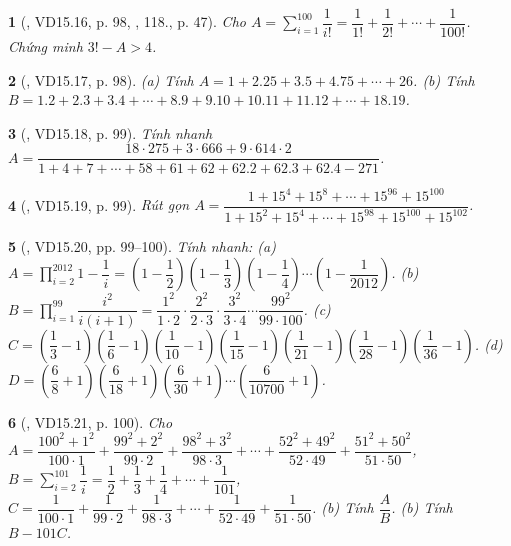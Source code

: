 \documentclass{article}
\newtheorem{baitoan}{}
\begin{document}
\begin{baitoan}[\cite{TLCT_THCS_Toan_6_so_hoc}, VD15.16, p. 98, \cite{Binh_Toan_6_tap_2}, 118., p. 47]
	Cho $A = \sum_{i=1}^{100} \dfrac{1}{i!} = \dfrac{1}{1!} + \dfrac{1}{2!} + \cdots + \dfrac{1}{100!}$. Chứng minh $3! - A > 4$.
\end{baitoan}

\begin{baitoan}[\cite{TLCT_THCS_Toan_6_so_hoc}, VD15.17, p. 98]
	(a) Tính $A = 1 + 2.25 + 3.5 + 4.75 + \cdots + 26$. (b) Tính $B = 1.2 + 2.3 + 3.4 + \cdots + 8.9 + 9.10 + 10.11 + 11.12 + \cdots + 18.19$.
\end{baitoan}

\begin{baitoan}[\cite{TLCT_THCS_Toan_6_so_hoc}, VD15.18, p. 99]
	Tính nhanh $A = \dfrac{18\cdot275 + 3\cdot666 + 9\cdot614\cdot2}{1 + 4 + 7 + \cdots + 58 + 61 + 62 + 62.2 + 62.3 + 62.4 - 271}$.
\end{baitoan}

\begin{baitoan}[\cite{TLCT_THCS_Toan_6_so_hoc}, VD15.19, p. 99]
	Rút gọn $A = \dfrac{1 + 15^4 + 15^8 + \cdots + 15^{96} + 15^{100}}{1 + 15^2 + 15^4 + \cdots + 15^{98} + 15^{100} + 15^{102}}$.
\end{baitoan}

\begin{baitoan}[\cite{TLCT_THCS_Toan_6_so_hoc}, VD15.20, pp. 99--100]
	Tính nhanh: (a) $A = \prod_{i=2}^{2012} 1  - \dfrac{1}{i} = \left(1 - \dfrac{1}{2}\right)\left(1 - \dfrac{1}{3}\right)\left(1 - \dfrac{1}{4}\right)\cdots\left(1 - \dfrac{1}{2012}\right)$. (b) $B = \prod_{i=1}^{99} \dfrac{i^2}{i(i + 1)} = \dfrac{1^2}{1\cdot2}\cdot\dfrac{2^2}{2\cdot3}\cdot\dfrac{3^2}{3\cdot4}\cdots\dfrac{99^2}{99\cdot100}$. (c) $C = \left(\dfrac{1}{3} - 1\right)\left(\dfrac{1}{6} - 1\right)\left(\dfrac{1}{10} - 1\right)\left(\dfrac{1}{15} - 1\right)\left(\dfrac{1}{21} - 1\right)\left(\dfrac{1}{28} - 1\right)\left(\dfrac{1}{36} - 1\right)$. (d) $D = \left(\dfrac{6}{8} + 1\right)\left(\dfrac{6}{18} + 1\right)\left(\dfrac{6}{30} + 1\right)\cdots\left(\dfrac{6}{10700} + 1\right)$.
\end{baitoan}

\begin{baitoan}[\cite{TLCT_THCS_Toan_6_so_hoc}, VD15.21, p. 100]
	Cho $A = \dfrac{100^2 + 1^2}{100\cdot1} + \dfrac{99^2 + 2^2}{99\cdot2} + \dfrac{98^2 + 3^2}{98\cdot3} + \cdots + \dfrac{52^2 + 49^2}{52\cdot49} + \dfrac{51^2 + 50^2}{51\cdot50}$, $B = \sum_{i=2}^{101} \dfrac{1}{i} = \dfrac{1}{2} + \dfrac{1}{3} + \dfrac{1}{4} + \cdots + \dfrac{1}{101}$, $C = \dfrac{1}{100\cdot1} + \dfrac{1}{99\cdot2} + \dfrac{1}{98\cdot3} + \cdots + \dfrac{1}{52\cdot49} + \dfrac{1}{51\cdot50}$. (b) Tính $\dfrac{A}{B}$. (b) Tính $B - 101C$.
\end{baitoan}
\end{document}
